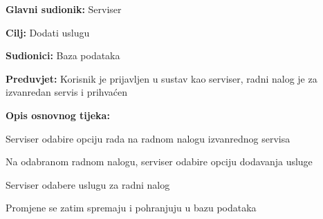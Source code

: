 \noindent {}
\begin{packed_item}

	\item \textbf{Glavni sudionik: } Serviser
	\item  \textbf{Cilj:} Dodati uslugu
	\item  \textbf{Sudionici:} Baza podataka
	\item  \textbf{Preduvjet:} Korisnik je prijavljen u sustav kao serviser, radni nalog je
	za izvanredan servis i prihvaćen
	\item  \textbf{Opis osnovnog tijeka:}

	\item[] \begin{packed_enum}

		\item Serviser odabire opciju rada na radnom nalogu izvanrednog servisa
		\item Na odabranom radnom nalogu, serviser odabire opciju dodavanja usluge
		\item Serviser odabere uslugu za radni nalog
		\item Promjene se zatim spremaju i pohranjuju u bazu podataka

	\end{packed_enum}
\end{packed_item}

